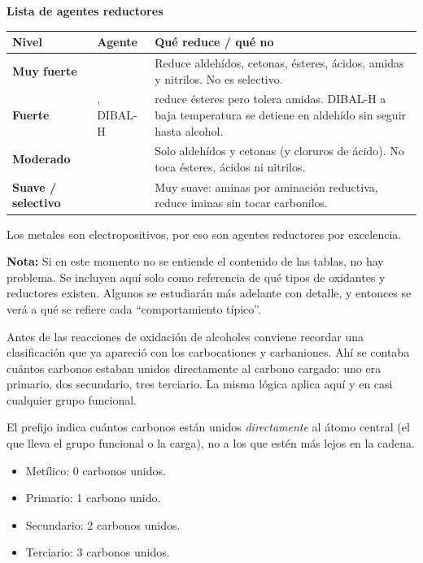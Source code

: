 \textbf{Lista de agentes reductores}
\begin{center}
\renewcommand{\arraystretch}{1.5}
\small
\begin{tabular}{L{2.5cm}|L{4.2cm}|L{6.8cm}}
\hline
\textbf{Nivel} & \textbf{Agente} & \textbf{Qué reduce / qué no} \\
\hline
\textbf{Muy fuerte} & 
 & 
Reduce aldehídos, cetonas, ésteres, ácidos, amidas y nitrilos. No es selectivo. \\
\hline
\textbf{Fuerte} & 
, DIBAL-H & 
 reduce ésteres pero tolera amidas. DIBAL-H a baja temperatura se detiene en aldehído sin seguir hasta alcohol. \\
\hline
\textbf{Moderado} & 
 & 
Solo aldehídos y cetonas (y cloruros de ácido). No toca ésteres, ácidos ni nitrilos. \\
\hline
\textbf{Suave / selectivo} & 
 & 
Muy suave: aminas por aminación reductiva, reduce iminas sin tocar carbonilos. \\
\hline
\end{tabular}
\normalsize
\end{center}

Los metales son electropositivos, por eso son 
agentes reductores por excelencia.

\textbf{Nota:} Si en este momento no se entiende el contenido de 
las tablas, no hay problema. Se incluyen aquí solo como referencia 
de qué tipos de oxidantes y reductores existen. Algunos se estudiarán 
más adelante con detalle, y entonces se verá a qué se refiere cada
``comportamiento típico''.

Antes de las reacciones de oxidación de alcoholes conviene recordar
una clasificación que ya apareció con los carbocationes y carbaniones.
Ahí se contaba cuántos carbonos estaban unidos directamente al carbono
cargado: uno era primario, dos secundario, tres terciario.
La misma lógica aplica aquí y en casi cualquier grupo funcional.

El prefijo indica cuántos carbonos están unidos \emph{directamente}
al átomo central (el que lleva el grupo funcional o la carga),
no a los que estén más lejos en la cadena.

\begin{itemize}
\item Metílico: 0 carbonos unidos.
\item Primario: 1 carbono unido.
\item Secundario: 2 carbonos unidos.
\item Terciario: 3 carbonos unidos.
\end{itemize}

